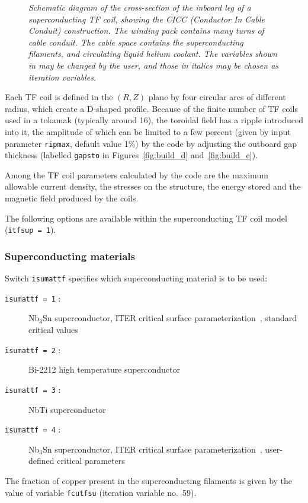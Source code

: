\documentclass[11pt,a4paper]{report}
\begin{document}
\begin{figure}[tbph]
\caption[Schematic diagram of the cross-section of a superconducting TF coil
inner leg]
{\label{fig:CICC}
  \textit{Schematic diagram of the cross-section of the inboard leg of a
    superconducting TF coil, showing the CICC (Conductor In Cable Conduit)
    construction. The winding pack contains many turns of cable conduit. The
    cable space contains the superconducting filaments, and circulating liquid
    helium coolant. The variables shown in  may be changed by the
    user, and those in italics may be chosen as iteration variables.}
}
\end{figure}

Each TF coil is defined in the $(R,Z)$ plane by four circular arcs of
different radius, which create a D-shaped profile. Because of the finite
number of TF coils used in a tokamak (typically around 16), the toroidal field
has a ripple introduced into it, the amplitude of which can be limited to a
few percent (given by input parameter \texttt{ripmax}, default value 1\%) by
the code by adjusting the outboard gap thickness (labelled \texttt{gapsto} in
Figures~\ref{fig:build_d} and~\ref{fig:build_e}).

Among the TF coil parameters calculated by the code are the maximum allowable
current density, the stresses on the structure, the energy stored and the
magnetic field produced by the coils.

The following options are available within the superconducting TF coil model
(\texttt{itfsup = 1}).

\subsubsection{Superconducting materials}

Switch \texttt{isumattf} specifies which superconducting material is to be
used:
\begin{description}
\item [\texttt{isumattf = 1} :] Nb$_3$Sn superconductor, ITER critical surface
  parameterization~\cite{iter_nb3sn}, standard critical values
\item [\texttt{isumattf = 2} :] Bi-2212 high temperature superconductor %
\item [\texttt{isumattf = 3} :] NbTi superconductor
\item [\texttt{isumattf = 4} :] Nb$_3$Sn superconductor, ITER critical surface
  parameterization~\cite{iter_nb3sn}, user-defined critical parameters
\end{description}
The fraction of copper present in the superconducting filaments is given by
the value of variable \texttt{fcutfsu} (iteration variable no.\ 59).
\end{document}
